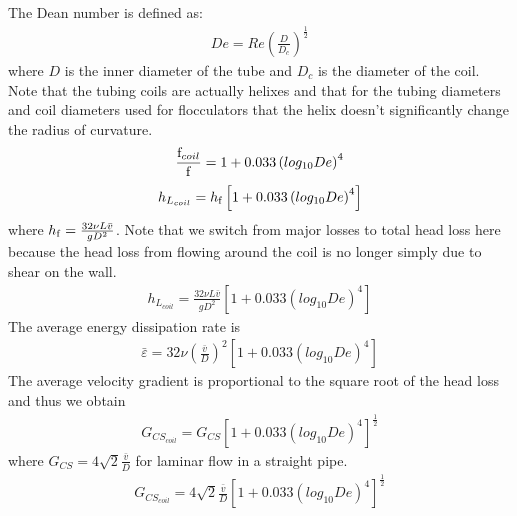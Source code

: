\documentclass[letterpaper,10pt,english]{sphinxmanual}
\begin{document}
The Dean number is defined as:
\begin{equation}\label{equation:Rapid_Mix/RM_Derivations:Rapid_Mix/RM_Derivations:90}
\begin{split}De = Re\left(\frac{D}{D_c}\right)^\frac{1}{2}\end{split}
\end{equation}
where \(D\) is the inner diameter of the tube and \(D_c\) is the diameter of the coil. Note that the tubing coils are actually helixes and that for the tubing diameters and coil diameters used for flocculators that the helix doesn’t significantly change the radius of curvature.
\begin{equation}\label{equation:Rapid_Mix/RM_Derivations:Rapid_Mix/RM_Derivations:91}
\begin{split}\frac{{\rm f}_{coil}}{{\rm f}} = 1 + 0.033\left(log_{10}De\right)^4\end{split}
\end{equation}\begin{equation}\label{equation:Rapid_Mix/RM_Derivations:Rapid_Mix/RM_Derivations:92}
\begin{split}h_{L_{coil}} = h_{{\rm f}} \left[ 1 + 0.033\left(log_{10}De\right)^4 \right]\end{split}
\end{equation}
where \(h_{{\rm f}} = \frac{32\nu L\bar v}{ g D^2}\). Note that we switch from major losses to total head loss here because the head loss from flowing around the coil is no longer simply due to shear on the
wall.
\begin{equation}\label{equation:Rapid_Mix/RM_Derivations:Rapid_Mix/RM_Derivations:93}
\begin{split}h_{L_{coil}} = \frac{32\nu L\bar v}{ g D^2} \left[ 1 + 0.033\left(log_{10}De\right)^4 \right]\end{split}
\end{equation}
The average energy dissipation rate is
\begin{equation}\label{equation:Rapid_Mix/RM_Derivations:Rapid_Mix/RM_Derivations:94}
\begin{split}\bar\varepsilon = 32\nu \left( \frac{\bar v}{D} \right)^2 \left[ 1 + 0.033\left(log_{10}De\right)^4 \right]\end{split}
\end{equation}
The average velocity gradient is proportional to the square root of the head loss and thus we obtain
\begin{equation}\label{equation:Rapid_Mix/RM_Derivations:Rapid_Mix/RM_Derivations:95}
\begin{split}G_{CS_{coil}} = G_{CS}\left[ 1 + 0.033\left(log_{10}De\right)^4  \right]^\frac{1}{2}\end{split}
\end{equation}
where \(G_{CS} =4\sqrt2 \frac{\bar v}{D}\) for laminar flow in a straight pipe.
\begin{equation}\label{equation:Rapid_Mix/RM_Derivations:Rapid_Mix/RM_Derivations:96}
\begin{split}G_{CS_{coil}} = 4\sqrt2 \frac{\bar v}{D}\left[ 1 + 0.033\left(log_{10}De\right)^4  \right]^\frac{1}{2}\end{split}
\end{equation}
\end{document}
